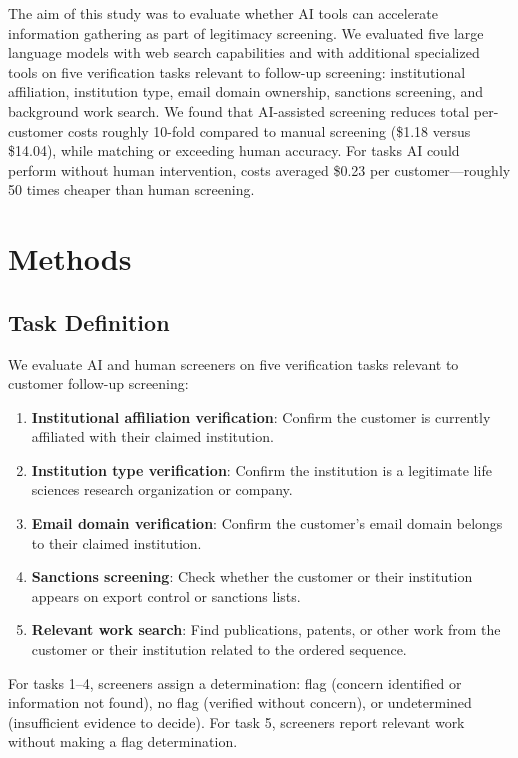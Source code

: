 \documentclass[utf8]{FrontiersinHarvard}
\begin{document}
The aim of this study was to evaluate whether AI tools can accelerate information gathering as part of legitimacy screening. We evaluated five large language models with web search capabilities and with additional specialized tools on five verification tasks relevant to follow-up screening: institutional affiliation, institution type, email domain ownership, sanctions screening, and background work search. We found that AI-assisted screening reduces total per-customer costs roughly 10-fold compared to manual screening (\$1.18 versus \$14.04), while matching or exceeding human accuracy. For tasks AI could perform without human intervention, costs averaged \$0.23 per customer---roughly 50 times cheaper than human screening.

\section{Methods}

\subsection{Task Definition}

We evaluate AI and human screeners on five verification tasks relevant to customer follow-up screening:

\begin{enumerate}
\item \textbf{Institutional affiliation verification}: Confirm the customer is currently affiliated with their claimed institution.
\item \textbf{Institution type verification}: Confirm the institution is a legitimate life sciences research organization or company.
\item \textbf{Email domain verification}: Confirm the customer's email domain belongs to their claimed institution.
\item \textbf{Sanctions screening}: Check whether the customer or their institution appears on export control or sanctions lists.
\item \textbf{Relevant work search}: Find publications, patents, or other work from the customer or their institution related to the ordered sequence.
\end{enumerate}

For tasks 1--4, screeners assign a determination: flag (concern identified or information not found), no flag (verified without concern), or undetermined (insufficient evidence to decide). For task 5, screeners report relevant work without making a flag determination.
\end{document}
